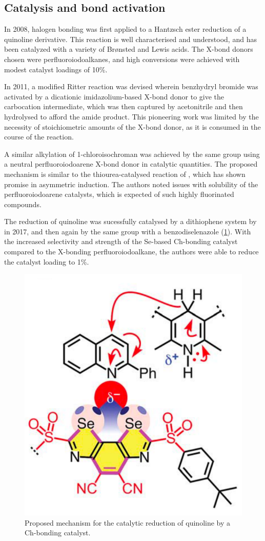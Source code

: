 \begin{refsection}
\subsection{Catalysis and bond activation}
In 2008, halogen bonding was first applied to a Hantzsch ester reduction of a quinoline derivative.\autocite{Bruckmann2008}
This reaction is well characterised and understood, and has been catalyzed with a variety of Br\o nsted and Lewis acids.
The X-bond donors chosen were perfluoroiodoalkanes, and high conversions were achieved with modest catalyst loadings of 10\%.

In 2011, a modified Ritter reaction was devised wherein benzhydryl bromide was activated by a dicationic imidazolium-based X-bond donor to give the carbocation intermediate, which was then captured by acetonitrile and then hydrolysed to afford the amide product.\autocite{Walter2011}
This pioneering work was limited by the necessity of stoichiometric amounts of the X-bond donor, as it is consumed in the course of the reaction.

A similar alkylation of 1-chloroisochroman was achieved by the same group using a neutral perfluoroiodoarene X-bond donor in catalytic quantities.\autocite{Kniep2013}
The proposed mechanism is similar to the thiourea-catalysed reaction of \citeauthor{Reisman2008}\autocite{Reisman2008}, which has shown promise in asymmetric induction.
The authors noted issues with solubility of the perfluoroiodoarene catalysts, which is expected of such highly fluorinated compounds.

The reduction of quinoline was sucessfully catalysed by a dithiophene system by \citeauthor{Benz2017} in 2017\autocite{Benz2017}, and then again by the same group with a benzodiselenazole (\cref{fig:quinoline-redn}).\autocite{Benz2017a}
With the increased selectivity and strength of the Se-based Ch-bonding catalyst compared to the X-bonding perfluoroiodoalkane, the authors were able to reduce the catalyst loading to 1\%.

\begin{figure}
    \centering
    \includegraphics[width=0.4\linewidth]{Figures/quinoline-redn.pdf}
    \caption{Proposed mechanism for the catalytic reduction of quinoline by a Ch-bonding catalyst.\autocite{Benz2017}}
    \label{fig:quinoline-redn}
\end{figure}


\end{refsection}
